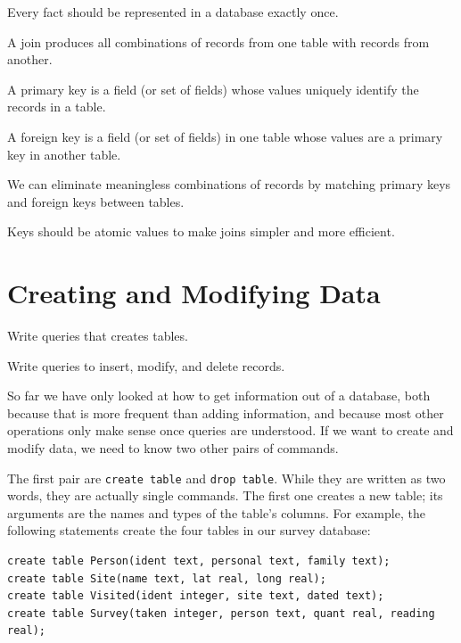 \documentclass{book}
\begin{document}
\begin{keypoints}
\begin{swcitemize}
\item
  Every fact should be represented in a database exactly once.
\item
  A join produces all combinations of records from one table with
  records from another.
\item
  A primary key is a field (or set of fields) whose values uniquely
  identify the records in a table.
\item
  A foreign key is a field (or set of fields) in one table whose values
  are a primary key in another table.
\item
  We can eliminate meaningless combinations of records by matching
  primary keys and foreign keys between tables.
\item
  Keys should be atomic values to make joins simpler and more efficient.
\end{swcitemize}
\end{keypoints}

\section{Creating and Modifying Data}

\begin{objectives}
\begin{swcitemize}
\item
  Write queries that creates tables.
\item
  Write queries to insert, modify, and delete records.
\end{swcitemize}
\end{objectives}

So far we have only looked at how to get information out of a database,
both because that is more frequent than adding information, and because
most other operations only make sense once queries are understood. If we
want to create and modify data, we need to know two other pairs of
commands.

The first pair are \texttt{create table} and \texttt{drop table}. While
they are written as two words, they are actually single commands. The
first one creates a new table; its arguments are the names and types of
the table's columns. For example, the following statements create the
four tables in our survey database:

\begin{verbatim}
create table Person(ident text, personal text, family text);
create table Site(name text, lat real, long real);
create table Visited(ident integer, site text, dated text);
create table Survey(taken integer, person text, quant real, reading real);
\end{verbatim}
\end{document}
